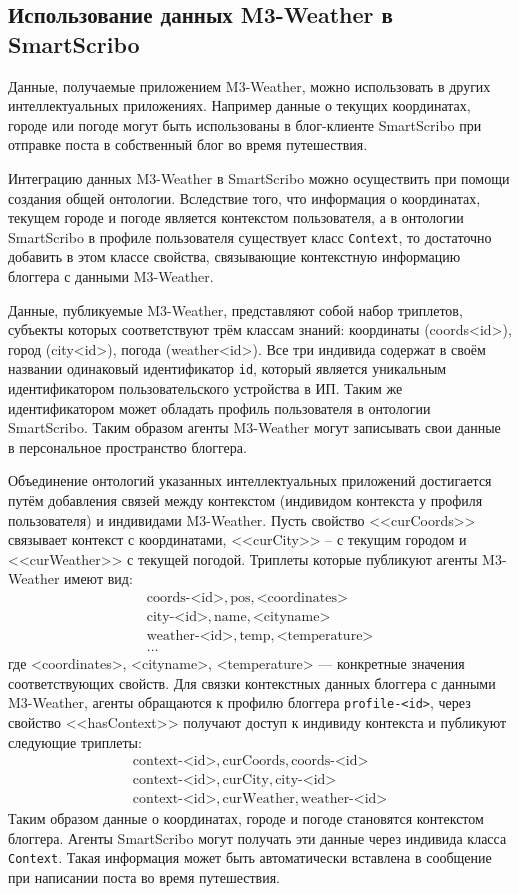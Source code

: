 \subsection*{Использование данных M3-Weather в SmartScribo}

Данные, получаемые приложением M3-Weather, можно использовать в других интеллектуальных приложениях. Например данные о текущих координатах, городе или погоде могут быть использованы в блог-клиенте SmartScribo при отправке поста в собственный блог во время путешествия.

Интеграцию данных M3-Weather в SmartScribo можно осуществить при помощи создания общей онтологии. Вследствие того, что информация о координатах, текущем городе и погоде является контекстом пользователя, а в онтологии SmartScribo в профиле пользователя существует класс {\tt Context}, то достаточно добавить в этом классе свойства, связывающие контекстную информацию блоггера с данными M3-Weather.

Данные, публикуемые M3-Weather, представляют собой набор триплетов, субъекты которых соответствуют трём классам знаний: координаты (coords<id>), город (city<id>), погода (weather<id>). Все три индивида содержат в своём названии одинаковый идентификатор {\tt id}, который является уникальным идентификатором пользовательского устройства в ИП. Таким же идентификатором может обладать профиль пользователя в онтологии SmartScribo. Таким образом агенты M3-Weather могут записывать свои данные в персональное пространство блоггера.

Объединение онтологий указанных интеллектуальных приложений достигается путём добавления связей между контекстом (индивидом контекста у профиля пользователя) и индивидами M3-Weather. Пусть свойство <<curCoords>> связывает контекст с координатами, <<curCity>> -- с текущим городом и <<curWeather>> с текущей погодой. Триплеты которые публикуют агенты M3-Weather имеют вид:
$$
\begin{array}{l}
\mbox{coords-<id>}, \mbox{pos}, \mbox{<coordinates>}\\
\mbox{city-<id>}, \mbox{name}, \mbox{<cityname>}\\
\mbox{weather-<id>}, \mbox{temp}, \mbox{<temperature>}\\
...
\end{array}
$$
где <coordinates>, <cityname>, <temperature> --- конкретные значения соответствующих свойств. Для связки контекстных данных блоггера с данными M3-Weather, агенты обращаются к профилю блоггера {\tt profile-<id>}, через свойство <<hasContext>> получают доступ к индивиду контекста и публикуют следующие триплеты:
$$
\begin{array}{l}
\mbox{context-<id>}, \mbox{curCoords}, \mbox{coords-<id>}\\
\mbox{context-<id>}, \mbox{curCity}, \mbox{city-<id>}\\
\mbox{context-<id>}, \mbox{curWeather}, \mbox{weather-<id>}
\end{array}
$$
Таким образом данные о координатах, городе и погоде становятся контекстом блоггера. Агенты SmartScribo могут получать эти данные через индивида класса {\tt Context}. Такая информация может быть автоматически вставлена в сообщение при написании поста во время путешествия.
